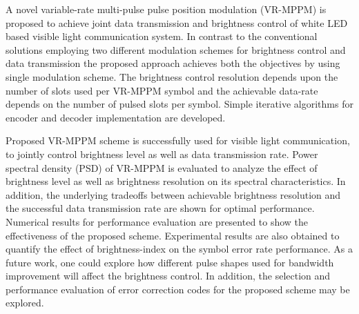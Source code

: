 A novel variable-rate multi-pulse pulse position modulation (VR-MPPM) is proposed to achieve joint data transmission and brightness control of white LED based visible light communication system. In contrast to the conventional solutions employing two different modulation schemes for brightness control and data transmission the proposed approach achieves both the objectives by using single modulation scheme. The brightness control resolution depends upon the number of slots used per VR-MPPM symbol and the achievable data-rate depends on the number of pulsed slots per symbol. Simple iterative algorithms for encoder and decoder implementation are developed. 

Proposed VR-MPPM scheme is successfully used for visible light communication, to jointly control brightness level as well as data transmission rate. Power spectral density (PSD) of VR-MPPM is evaluated to analyze the effect of brightness level as well as brightness resolution on its spectral characteristics. In addition, the underlying tradeoffs between achievable brightness resolution and the successful data transmission rate are shown for optimal performance. Numerical results for performance evaluation are presented to show the effectiveness of the proposed scheme. Experimental results are also obtained to quantify the effect of brightness-index on the symbol error rate performance. As a future work, one could explore how different pulse shapes used for bandwidth improvement will affect the brightness control. In addition, the selection and performance evaluation of error correction codes for the proposed scheme may be explored.
